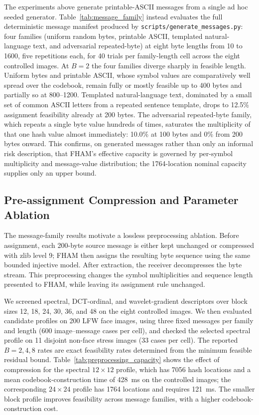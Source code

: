 \documentclass[preprint,12pt]{elsarticle}
\theoremstyle{plain}
\begin{document}
The experiments above generate printable-ASCII messages from a single ad hoc
seeded generator. Table~\ref{tab:message_family} instead evaluates the full
deterministic message manifest produced by \texttt{scripts/generate\_messages.py}:
four families (uniform random bytes, printable ASCII, templated natural-language text, and
adversarial repeated-byte) at eight byte lengths from 10 to 1600, five
repetitions each, for 40 trials per family-length cell across the eight
controlled images. At $B=2$ the four families diverge sharply in feasible
length. Uniform bytes and printable ASCII, whose symbol values are
comparatively well spread over the codebook, remain fully or mostly feasible
up to 400 bytes and partially so at 800--1200. Templated natural-language text, dominated by a
small set of common ASCII letters from a repeated sentence template, drops to
12.5\% assignment feasibility already at 200 bytes. The adversarial repeated-byte family,
which repeats a single byte value hundreds of times, saturates the
multiplicity of that one hash value almost immediately: 10.0\% at 100 bytes
and 0\% from 200 bytes onward. This confirms, on generated messages rather
than only an informal risk description, that FHAM's effective capacity is
governed by per-symbol multiplicity and message-value distribution; the
1764-location nominal capacity supplies only an upper bound.

\begin{table}[!t]
\centering
\caption{Assignment Feasibility Rate by Message Family and Length ($B=2$)}
\label{tab:message_family}

\end{table}

\subsection{Pre-assignment Compression and Parameter Ablation}
The message-family results motivate a lossless preprocessing ablation. Before
assignment, each 200-byte source message is either kept unchanged or compressed
with zlib level 9; FHAM then assigns the resulting byte sequence using the same
bounded injective model. After extraction, the receiver decompresses the byte
stream. This preprocessing changes the symbol multiplicities and sequence
length presented to FHAM, while leaving its assignment rule unchanged.

We screened spectral, DCT-ordinal, and wavelet-gradient descriptors over block
sizes 12, 18, 24, 30, 36, and 48 on the eight controlled images. We then
evaluated candidate profiles on 200 LFW face images, using three fixed messages
per family and length (600 image--message cases per cell), and checked the
selected spectral profile on 11 disjoint non-face stress images (33 cases per
cell). The reported $B=2,4,8$ rates are exact feasibility rates determined from
the minimum feasible residual bound. Table~\ref{tab:preprocessing_capacity}
shows the effect of compression for the spectral $12\times12$ profile, which
has 7056 hash locations and a mean codebook-construction time of 428~ms on the
controlled images; the corresponding $24\times24$ profile has 1764 locations
and requires 121~ms. The smaller block profile improves feasibility across
message families, with a higher codebook-construction cost.
\end{document}
